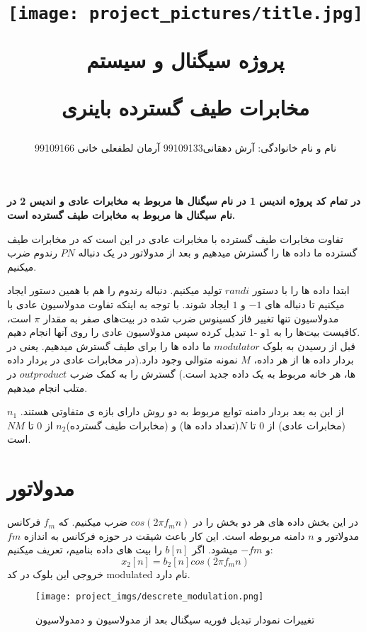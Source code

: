 \documentclass[11pt]{article}
\begin{document}
\setlength{\textwidth}{180mm}
\setlength{\textheight}{235mm }
\setlength{\textwidth}{12cm}
\setlength{\textheight}{19.5cm}

\begin{persian}
\title{
\centerline{\texttt{[image: project\_pictures/title.jpg]}}
پروژه سیگنال و سیستم

مخابرات طیف گسترده باینری
}
\author{
نام و نام خانوادگی:  آرش دهقانی99109133 
آرمان لطفعلی خانی 99109166
}
\date{}
\maketitle
\newpage


\textbf{در تمام کد پروژه اندیس 1 در نام سیگنال ها مربوط به مخابرات عادی و اندیس 2 در نام سیگنال ها مربوط به مخابرات طیف گسترده است.} 

تفاوت مخابرات طیف گسترده با مخابرات عادی در این است که در مخابرات طیف گسترده ما داده ها را گسترش میدهیم و بعد از مدولاتور در یک دنباله $PN$ رندوم ضرب میکنیم.

ابتدا داده ها را با دستور $randi$ تولید میکنیم. 
دنباله رندوم را هم با همین دستور ایجاد میکنیم تا دنباله های $-1$ و $1$ ایجاد شوند. 
با توجه به اینکه تفاوت مدولاسیون عادی با مدولاسیون  تنها تغییر فاز کسینوس ضرب شده در بیت‌های صفر به مقدار $\pi$ است، کافیست بیت‌ها را به 1و -1 تبدیل کرده سپس مدولاسیون عادی را روی آنها انجام دهیم.
\\ 
قبل از رسیدن به بلوک $modulator$ ما داده ها را برای طیف گسترش میدهیم. یعنی در بردار داده ها از هر داده، $M$ نمونه متوالی وجود دارد.(در مخابرات عادی در بردار داده ها، هر خانه مربوط به یک داده جدید است.) گسترش را به کمک ضرب $out product$ در متلب انجام میدهیم. 

از این به بعد بردار دامنه توابع مربوط به دو روش دارای بازه ی متفاوتی هستند. $n_1$(مخابرات عادی) از $0$ تا $N$(تعداد داده ها) و 
(مخابرات طیف گسترده)$n_2$ 
از 
$0$ تا $NM$ است.
\section{مدولاتور}
در این بخش داده های هر دو بخش را در 
$cos(2\pi f_m n)$ ضرب میکنیم.
که $f_m$ فرکانس مدولاتور و $n$ دامنه مربوطه است. این کار باعث شیقت در حوزه فرکانس به اندازه $fm$ و $-fm$ میشود. اگر $b[n]$ را بیت های داده بنامیم، تعریف میکنیم:
$$
x_2[n] = b_2[n] cos(2\pi f_m n)
$$
خروجی این بلوک در کد modulated نام دارد.


\begin{figure}[H]
\centerline{\texttt{[image: project\_imgs/descrete\_modulation.png]}}
\caption{تغییرات نمودار تبدیل فوریه سیگنال بعد از مدولاسیون و دمدولاسیون}
\end{figure}



\end{persian}
\end{document}
